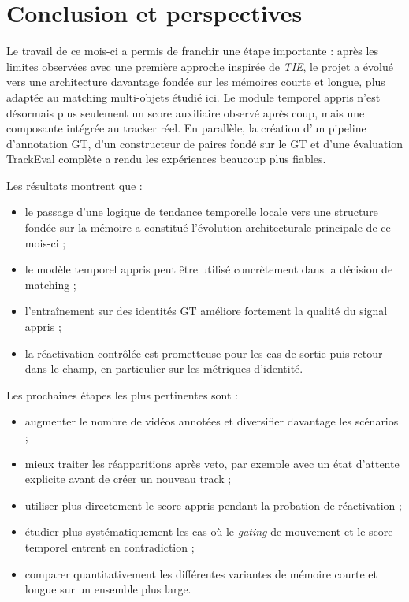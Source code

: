 \documentclass[11pt,a4paper]{article}
\begin{document}
\section{Conclusion et perspectives}

Le travail de ce mois-ci a permis de franchir une étape importante : après les limites observées avec une première approche inspirée de \textit{TIE}, le projet a évolué vers une architecture davantage fondée sur les mémoires courte et longue, plus adaptée au matching multi-objets étudié ici. Le module temporel appris n'est désormais plus seulement un score auxiliaire observé après coup, mais une composante intégrée au tracker réel. En parallèle, la création d'un pipeline d'annotation GT, d'un constructeur de paires fondé sur le GT et d'une évaluation TrackEval complète a rendu les expériences beaucoup plus fiables.

Les résultats montrent que :
\begin{itemize}
    \item le passage d'une logique de tendance temporelle locale vers une structure fondée sur la mémoire a constitué l'évolution architecturale principale de ce mois-ci ;
    \item le modèle temporel appris peut être utilisé concrètement dans la décision de matching ;
    \item l'entraînement sur des identités GT améliore fortement la qualité du signal appris ;
    \item la réactivation contrôlée est prometteuse pour les cas de sortie puis retour dans le champ, en particulier sur les métriques d'identité.
\end{itemize}

Les prochaines étapes les plus pertinentes sont :
\begin{itemize}
    \item augmenter le nombre de vidéos annotées et diversifier davantage les scénarios ;
    \item mieux traiter les réapparitions après veto, par exemple avec un état d'attente explicite avant de créer un nouveau track ;
    \item utiliser plus directement le score appris pendant la probation de réactivation ;
    \item étudier plus systématiquement les cas où le \textit{gating} de mouvement et le score temporel entrent en contradiction ;
    \item comparer quantitativement les différentes variantes de mémoire courte et longue sur un ensemble plus large.
\end{itemize}
\end{document}
